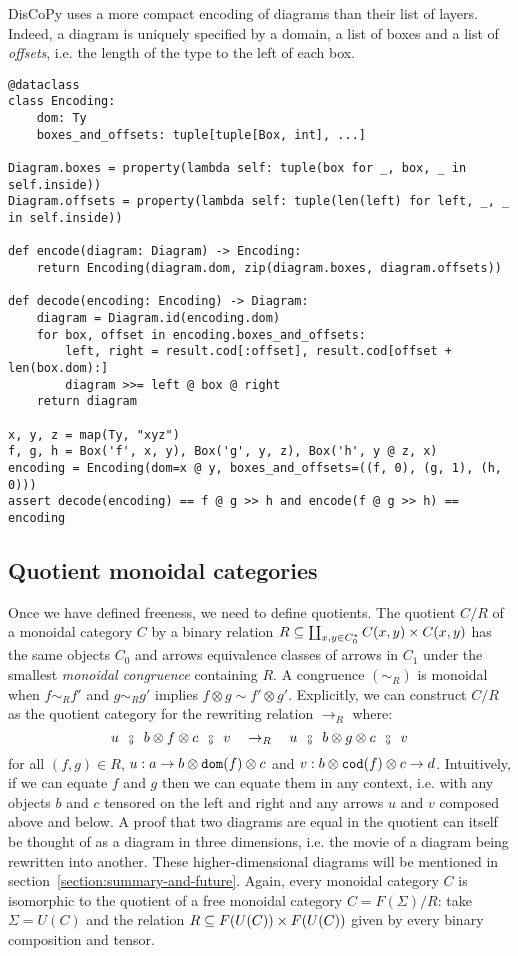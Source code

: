 \begin{remark}
DisCoPy uses a more compact encoding of diagrams than their list of layers.
Indeed, a diagram is uniquely specified by a domain, a list of boxes and a list of \emph{offsets}, i.e. the length of the type to the left of each box.

\begin{verbatim}
@dataclass
class Encoding:
    dom: Ty
    boxes_and_offsets: tuple[tuple[Box, int], ...]

Diagram.boxes = property(lambda self: tuple(box for _, box, _ in self.inside))
Diagram.offsets = property(lambda self: tuple(len(left) for left, _, _ in self.inside))

def encode(diagram: Diagram) -> Encoding:
    return Encoding(diagram.dom, zip(diagram.boxes, diagram.offsets))

def decode(encoding: Encoding) -> Diagram:
    diagram = Diagram.id(encoding.dom)
    for box, offset in encoding.boxes_and_offsets:
        left, right = result.cod[:offset], result.cod[offset + len(box.dom):]
        diagram >>= left @ box @ right
    return diagram

x, y, z = map(Ty, "xyz")
f, g, h = Box('f', x, y), Box('g', y, z), Box('h', y @ z, x)
encoding = Encoding(dom=x @ y, boxes_and_offsets=((f, 0), (g, 1), (h, 0)))
assert decode(encoding) == f @ g >> h and encode(f @ g >> h) == encoding
\end{verbatim}
\end{remark}

\subsection{Quotient monoidal categories}\label{subsection:quotient-monoidal}

Once we have defined freeness, we need to define quotients.
The quotient $C / R$ of a monoidal category $C$ by a binary relation $R \subseteq \coprod_{x, y \in C_0^\star} C(x, y) \times C(x, y)$ has the same objects $C_0$ and arrows equivalence classes of arrows in $C_1$ under the smallest \emph{monoidal congruence} containing $R$.
A congruence $(\sim_R)$ is monoidal when $f \sim_R f'$ and $g \sim_R g'$ implies $f \otimes g \sim f' \otimes g'$.
Explicitly, we can construct $C / R$ as the quotient category for the rewriting relation $\to_R$ where:
$$u \s \fcmp \s b \otimes f \otimes c \s \fcmp \s v \quad
\to_R \quad u \s \fcmp \s b \otimes g \otimes c \s \fcmp \s v$$
for all $(f, g) \in R$, $u : a \to b \otimes \mathtt{dom}(f) \otimes c$ and $v : b \otimes \mathtt{cod}(f) \otimes c \to d$.
Intuitively, if we can equate $f$ and $g$ then we can equate them in any context, i.e. with any objects $b$ and $c$ tensored on the left and right and any arrows $u$ and $v$ composed above and below.
A proof that two diagrams are equal in the quotient can itself be thought of as a diagram in three dimensions, i.e. the movie of a diagram being rewritten into another.
These higher-dimensional diagrams will be mentioned in section~\ref{section:summary-and-future}.
Again, every monoidal category $C$ is isomorphic to the quotient of a free monoidal category $C = F(\Sigma) / R$: take $\Sigma = U(C)$ and the relation $R \subseteq F(U(C)) \times F(U(C))$ given by every binary composition and tensor.

